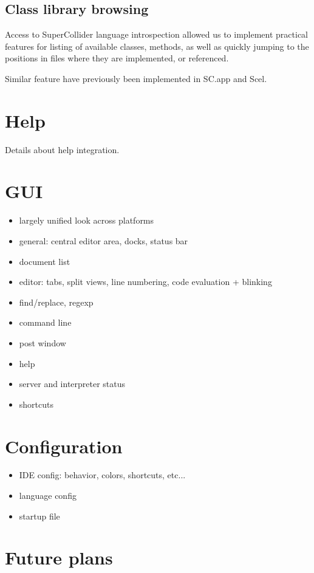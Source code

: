 \documentclass[11pt,a4paper]{article}
\begin{document}
\subsection{Class library browsing}

Access to SuperCollider language introspection allowed us to implement practical features for
listing of available classes, methods, as well as quickly jumping to the positions in files
where they are implemented, or referenced.

Similar feature have previously been implemented in SC.app and Scel.

\section{Help}

Details about help integration.

\section{GUI}

\begin{itemize}
 \item largely unified look across platforms
 \item general: central editor area, docks, status bar
 \item document list
 \item editor: tabs, split views, line numbering, code evaluation + blinking
 \item find/replace, regexp
 \item command line
 \item post window
 \item help
 \item server and interpreter status
 \item shortcuts
\end{itemize}

\section{Configuration}

\begin{itemize}
 \item IDE config: behavior, colors, shortcuts, etc...
 \item language config
 \item startup file
\end{itemize}


\section{Future plans}
\end{document}
